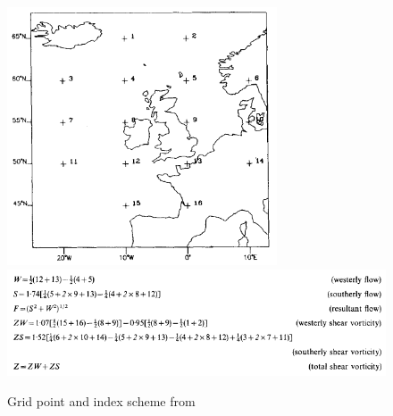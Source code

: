\documentclass[12pt, oneside, a4paper, headsepline, plainheadsepline]{scrbook}
\begin{document}
\begin{figure}[h]
\centering
\includegraphics[width=8cm]{jones1993a.png}
\includegraphics[width=12cm]{jones1993b.png}
\caption{
Grid point and index scheme from \citet{Jones1992}}
\label{fig:jct02}
\end{figure}
\end{document}

